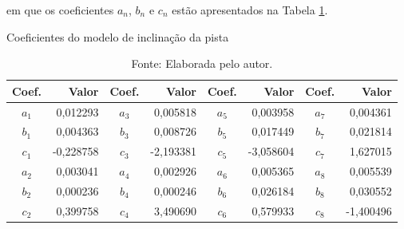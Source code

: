 em que os coeficientes $a_n$, $b_n$ e $c_n$ estão apresentados na Tabela \ref{tab:coeficientes}.


\begin{table}[H]
	\centering
	\caption{Coeficientes do modelo de inclinação da pista}
	\begin{tabular}{crcrcrcr}
		\toprule
		\textbf{Coef.} & \textbf{Valor} & \textbf{Coef.} & \textbf{Valor} & \textbf{Coef.} & \textbf{Valor} & \textbf{Coef.} & \textbf{Valor}\\
		\hline
        $a_1$   & 0,012293 & $a_3$   & 0,005818 & $a_5$   & 0,003958 & $a_7$   & 0,004361  \\
        $b_1$   & 0,004363 & $b_3$   & 0,008726 & $b_5$   & 0,017449 & $b_7$   & 0,021814  \\
        $c_1$   &-0,228758 & $c_3$   &-2,193381 & $c_5$   &-3,058604 & $c_7$   & 1,627015  \\
        $a_2$   & 0,003041 & $a_4$   & 0,002926 & $a_6$   & 0,005365 & $a_8$   & 0,005539  \\
        $b_2$   & 0,000236 & $b_4$   & 0,000246 & $b_6$   & 0,026184 & $b_8$   & 0,030552  \\
        $c_2$   & 0,399758 & $c_4$   & 3,490690 & $c_6$   & 0,579933 & $c_8$   &-1,400496  \\
		\bottomrule
	\end{tabular}
	\caption*{\footnotesize Fonte: Elaborada pelo autor.}
	\label{tab:coeficientes}
\end{table}


